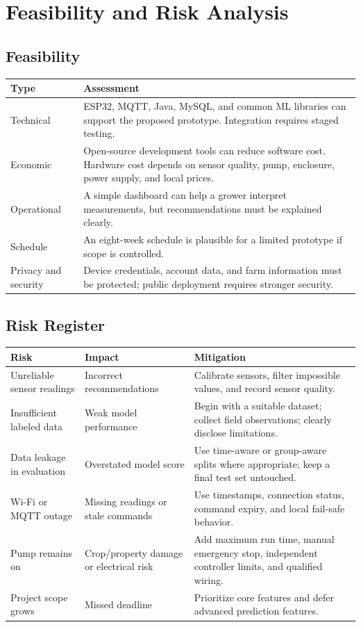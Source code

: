 \documentclass[12pt,a4paper]{report}
\begin{document}
\chapter{Feasibility and Risk Analysis}
\section{Feasibility}
\begin{longtable}{p{}p{}}
\toprule
\textbf{Type} & \textbf{Assessment}\\
\midrule
Technical & ESP32, MQTT, Java, MySQL, and common ML libraries can support the proposed prototype. Integration requires staged testing.\\
Economic & Open-source development tools can reduce software cost. Hardware cost depends on sensor quality, pump, enclosure, power supply, and local prices.\\
Operational & A simple dashboard can help a grower interpret measurements, but recommendations must be explained clearly.\\
Schedule & An eight-week schedule is plausible for a limited prototype if scope is controlled.\\
Privacy and security & Device credentials, account data, and farm information must be protected; public deployment requires stronger security.\\
\bottomrule
\end{longtable}

\section{Risk Register}
\begin{longtable}{p{}p{}p{}}
\toprule
\textbf{Risk} & \textbf{Impact} & \textbf{Mitigation}\\
\midrule
Unreliable sensor readings & Incorrect recommendations & Calibrate sensors, filter impossible values, and record sensor quality.\\
Insufficient labeled data & Weak model performance & Begin with a suitable dataset; collect field observations; clearly disclose limitations.\\
Data leakage in evaluation & Overstated model score & Use time-aware or group-aware splits where appropriate; keep a final test set untouched.\\
Wi-Fi or MQTT outage & Missing readings or stale commands & Use timestamps, connection status, command expiry, and local fail-safe behavior.\\
Pump remains on & Crop/property damage or electrical risk & Add maximum run time, manual emergency stop, independent controller limits, and qualified wiring.\\
Project scope grows & Missed deadline & Prioritize core features and defer advanced prediction features.\\
\bottomrule
\end{longtable}
\end{document}
